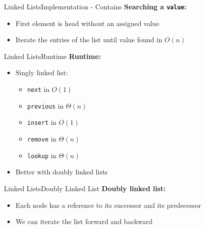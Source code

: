 
\begin{frame}[fragile]{Linked Lists}{Implementation - Contains}
  \textbf{Searching a \texttt{value}:}
  \begin{itemize}
    \item<2->
      First element is head without an assigned value
    \item<3->
      Iterate the entries of the list until value found in $O(n)$
      
  \end{itemize}
\end{frame}


\begin{frame}{Linked Lists}{Runtime}
  \textbf{Runtime:}
  \begin{itemize}
    \item<2->
      Singly linked list:
      \begin{itemize}
        \item<3-> {\color{Mittel-Blau}\texttt{next}} in $O(1)$
        \item<4-> {\color{Mittel-Blau}\texttt{previous}} in $\Theta(n)$
        \item<5-> {\color{Mittel-Blau}\texttt{insert}} in $O(1)$
        \item<6-> {\color{Mittel-Blau}\texttt{remove}} in $\Theta(n)$
        \item<7-> {\color{Mittel-Blau}\texttt{lookup}} in $\Theta(n)$
      \end{itemize}
    \item<8->
      Better with {\color{Mittel-Blau}doubly linked lists}
  \end{itemize}
\end{frame}


\begin{frame}{Linked Lists}{Doubly Linked List}
  \textbf{Doubly linked list:}
  \begin{itemize}
    \item<2->
      Each node has a reference to its successor and its
      {\color{Mittel-Blau}predecessor}
    \item<3->
      We can iterate the list forward and backward
  \end{itemize}
  \begin{flushleft}
    
  \end{flushleft}
\end{frame}

